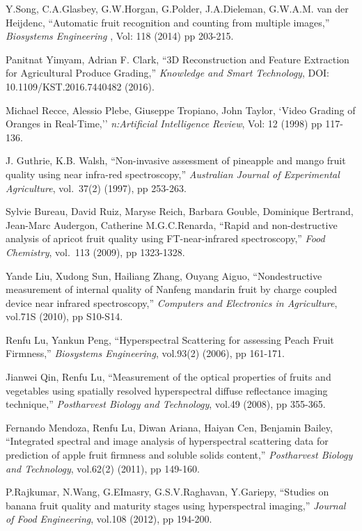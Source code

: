 \documentclass{bmvc2k}
\begin{document}
\begin{thebibliography}{1}
	Y.Song, C.A.Glasbey, G.W.Horgan, G.Polder, J.A.Dieleman, G.W.A.M. van der Heijdenc, ``Automatic fruit recognition and counting from multiple images,'' {\em Biosystems Engineering }, Vol: 118 (2014) pp 203-215.
	
	Panitnat Yimyam, Adrian F. Clark, ``3D Reconstruction and Feature Extraction for Agricultural Produce Grading,'' {\em Knowledge and Smart Technology}, DOI: 10.1109/KST.2016.7440482 (2016).
	
	Michael Recce, Alessio Plebe, Giuseppe Tropiano, John Taylor, `Video Grading of Oranges in Real-Time,'' {\em n:Artificial Intelligence Review}, Vol: 12 (1998) pp 117-136.
	
	J. Guthrie, K.B. Walsh, ``Non-invasive assessment of pineapple and mango fruit quality using near infra-red spectroscopy,'' {\em Australian Journal of Experimental Agriculture}, vol.~37(2) (1997), pp 253-263.
	
	Sylvie Bureau, David Ruiz, Maryse Reich, Barbara Gouble, Dominique Bertrand, Jean-Marc Audergon, Catherine M.G.C.Renarda, ``Rapid and non-destructive analysis of apricot fruit quality using FT-near-infrared spectroscopy,'' {\em Food Chemistry}, vol.~113 (2009), pp 1323-1328.
	
	Yande Liu, Xudong Sun, Hailiang Zhang, Ouyang Aiguo, ``Nondestructive measurement of internal quality of Nanfeng mandarin fruit by charge coupled device near infrared spectroscopy,'' {\em Computers and Electronics in Agriculture}, vol.71S (2010), pp S10-S14.
	
	Renfu Lu, Yankun Peng, ``Hyperspectral Scattering for assessing Peach Fruit Firmness,'' {\em Biosystems Engineering}, vol.93(2) (2006), pp 161-171.
	
	Jianwei Qin, Renfu Lu, ``Measurement of the optical properties of fruits and vegetables using spatially resolved hyperspectral diffuse reflectance imaging technique,'' {\em Postharvest Biology and Technology}, vol.49 (2008), pp 355-365.
	
	Fernando Mendoza, Renfu Lu, Diwan Ariana, Haiyan Cen, Benjamin Bailey, ``Integrated spectral and image analysis of hyperspectral scattering data for prediction of apple fruit firmness and soluble solids content,'' {\em Postharvest Biology and Technology}, vol.62(2) (2011), pp 149-160.
	
	P.Rajkumar, N.Wang, G.EImasry, G.S.V.Raghavan, Y.Gariepy, ``Studies on banana fruit quality and maturity stages using hyperspectral imaging,'' {\em Journal of Food Engineering}, vol.108 (2012), pp 194-200.
	

\end{thebibliography}
\end{document}
